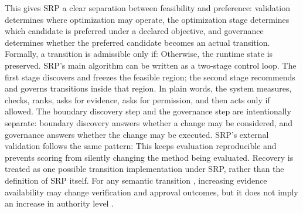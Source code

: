 {}This gives SRP a clear separation between feasibility and preference: validation determines where optimization may operate, the optimization stage determines which candidate is preferred under a declared objective, and governance determines whether the preferred candidate becomes an actual transition.\markdownRendererParagraphSeparator
{}Formally, a transition is admissible only if:\markdownRendererInterblockSeparator
{}\markdownRendererInterblockSeparator
{}Otherwise, the runtime state is preserved.\markdownRendererInterblockSeparator
{}
\markdownRendererSectionEnd \markdownRendererSectionBegin
{}\markdownRendererInterblockSeparator
{}SRP's main algorithm can be written as a two-stage control loop. The first stage discovers and freezes the feasible region; the second stage recommends and governs transitions inside that region.\markdownRendererParagraphSeparator
{}In plain words, the system measures, checks, ranks, asks for evidence, asks for permission, and then acts only if allowed.\markdownRendererInterblockSeparator
{}\markdownRendererInterblockSeparator
{}The boundary discovery step and the governance step are intentionally separate: boundary discovery answers whether a change may be considered, and governance answers whether the change may be executed.\markdownRendererParagraphSeparator
{}SRP's external validation follows the same pattern:\markdownRendererInterblockSeparator
{}\markdownRendererInterblockSeparator
{}This keeps evaluation reproducible and prevents scoring from silently changing the method being evaluated.\markdownRendererSoftLineBreak
{}Recovery is treated as one possible transition implementation under SRP, rather than the definition of SRP itself.\markdownRendererInterblockSeparator
{}
\markdownRendererSectionEnd \markdownRendererSectionBegin
{}\markdownRendererInterblockSeparator
{}For any semantic transition , increasing evidence availability  may change verification and approval outcomes, but it does not imply an increase in authority level .\markdownRendererParagraphSeparator
